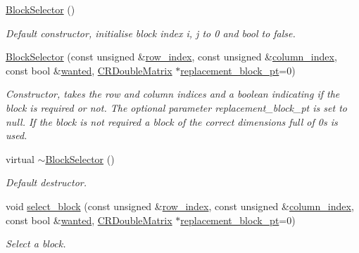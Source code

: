 \begin{DoxyCompactItemize}
\item 
\hyperlink{classoomph_1_1BlockSelector_aaed92a7e9c7845821e616e744611cc7c}{Block\+Selector} ()
\begin{DoxyCompactList}\small\item\em Default constructor, initialise block index i, j to 0 and bool to false. \end{DoxyCompactList}\item 
\hyperlink{classoomph_1_1BlockSelector_a8da9f5e41598377786de44af3ddb26b3}{Block\+Selector} (const unsigned \&\hyperlink{classoomph_1_1BlockSelector_abc7c527ed8c1080d98bddf2a1f3c1801}{row\+\_\+index}, const unsigned \&\hyperlink{classoomph_1_1BlockSelector_a2b18303d1dfdfe5aeee43fc9a5452f5c}{column\+\_\+index}, const bool \&\hyperlink{classoomph_1_1BlockSelector_aceece28b03cdc41a43205603380126b9}{wanted}, \hyperlink{classoomph_1_1CRDoubleMatrix}{C\+R\+Double\+Matrix} $\ast$\hyperlink{classoomph_1_1BlockSelector_ad40b427ae3228721a702f5bf82b2b829}{replacement\+\_\+block\+\_\+pt}=0)
\begin{DoxyCompactList}\small\item\em Constructor, takes the row and column indices and a boolean indicating if the block is required or not. The optional parameter replacement\+\_\+block\+\_\+pt is set to null. If the block is not required a block of the correct dimensions full of 0s is used. \end{DoxyCompactList}\item 
virtual \hyperlink{classoomph_1_1BlockSelector_a591da9d609cad2e823380782a3de24a6}{$\sim$\+Block\+Selector} ()
\begin{DoxyCompactList}\small\item\em Default destructor. \end{DoxyCompactList}\item 
void \hyperlink{classoomph_1_1BlockSelector_a62037fdd93cc7b06a781ef4408957d38}{select\+\_\+block} (const unsigned \&\hyperlink{classoomph_1_1BlockSelector_abc7c527ed8c1080d98bddf2a1f3c1801}{row\+\_\+index}, const unsigned \&\hyperlink{classoomph_1_1BlockSelector_a2b18303d1dfdfe5aeee43fc9a5452f5c}{column\+\_\+index}, const bool \&\hyperlink{classoomph_1_1BlockSelector_aceece28b03cdc41a43205603380126b9}{wanted}, \hyperlink{classoomph_1_1CRDoubleMatrix}{C\+R\+Double\+Matrix} $\ast$\hyperlink{classoomph_1_1BlockSelector_ad40b427ae3228721a702f5bf82b2b829}{replacement\+\_\+block\+\_\+pt}=0)
\begin{DoxyCompactList}\small\item\em Select a block. \end{DoxyCompactList}\item 

\end{DoxyCompactItemize}
